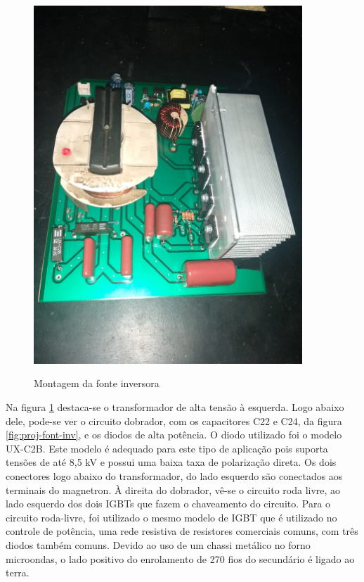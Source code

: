 \begin{figure}[H]
    \centering
    \caption{Montagem da fonte inversora}
    \includegraphics[width=0.9\textwidth]{./dados/figuras/montagem-inverter}
    \label{fig:figura-montagem-inverter}
\end{figure}

Na figura \ref{fig:figura-montagem-inverter} destaca-se o transformador de alta tensão à esquerda. Logo abaixo dele, pode-se ver o circuito dobrador, com os capacitores C22 e C24, da figura \ref{fig:proj-font-inv}, e os diodos de alta potência. O diodo utilizado foi o modelo UX-C2B. Este modelo é adequado para este tipo de aplicação pois suporta tensões de até 8,5 kV e possui uma baixa taxa de polarização direta. Os dois conectores logo abaixo do transformador, do lado esquerdo são conectados aos terminais do magnetron. À direita do dobrador, vê-se o circuito roda livre, ao lado esquerdo dos dois IGBTs que fazem o chaveamento do circuito. Para o circuito roda-livre, foi utilizado o mesmo modelo de IGBT que é utilizado no controle de potência, uma rede resistiva de resistores comerciais comuns, com três diodos também comuns. Devido ao uso de um chassi metálico no forno microondas, o lado positivo do enrolamento de 270 fios do secundário é ligado ao terra. 

